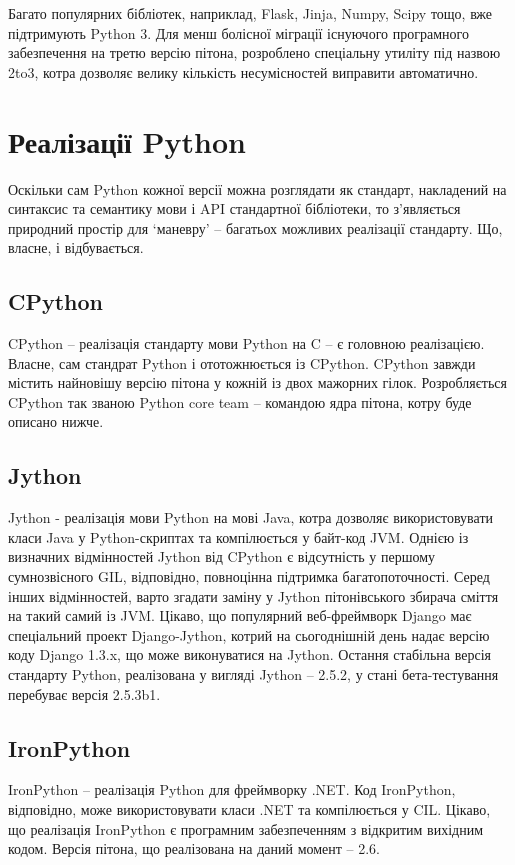 \documentclass[a4paper, 12pt]{article}
\begin{document}
Багато популярних бібліотек, наприклад, Flask, Jinja, Numpy, Scipy тощо, вже підтримують
Python 3. Для менш болісної міграції існуючого програмного забезпечення на третю версію
пітона, розроблено спеціальну утиліту під назвою 2to3, котра дозволяє велику кількість
несумісностей виправити автоматично.

\section{Реалізації Python}
Оскільки сам Python кожної версії можна розглядати як стандарт, накладений на синтаксис та
семантику мови і API стандартної бібліотеки, то з'являється природний простір для `маневру' -- багатьох можливих реалізації стандарту. Що, власне, і відбувається.

\subsection{CPython}
CPython -- реалізація стандарту мови Python на C -- є головною реалізацією. Власне, сам стандрат Python і ототожнюється із CPython. CPython завжди містить найновішу версію пітона у кожній із двох мажорних гілок. Розробляється CPython так званою Python core team -- командою ядра пітона, котру буде описано нижче.


\subsection{Jython}
Jython - реалізація мови Python на мові Java, котра дозволяє використовувати класи Java у 
Python-скриптах та компілюється у байт-код JVM. Однією із визначних відмінностей Jython від
CPython є відсутність у першому сумнозвісного GIL, відповідно, повноцінна підтримка 
багатопоточності. Серед інших відмінностей, варто згадати заміну у Jython пітонівського 
збирача сміття на такий самий із JVM.
Цікаво, що популярний веб-фреймворк Django має спеціальний проект Django-Jython, котрий на
сьогоднішній день надає версію коду Django 1.3.x, що може виконуватися на Jython.
Остання стабільна версія стандарту Python, реалізована у вигляді Jython -- 2.5.2, у стані 
бета-тестування перебуває версія 2.5.3b1.

\subsection{IronPython}
IronPython -- реалізація Python для фреймворку .NET. Код IronPython, відповідно, може 
використовувати класи .NET та компілюється у CIL. Цікаво, що реалізація IronPython є 
програмним забезпеченням з відкритим вихідним кодом. Версія пітона, що реалізована на даний 
момент -- 2.6.
\end{document}
